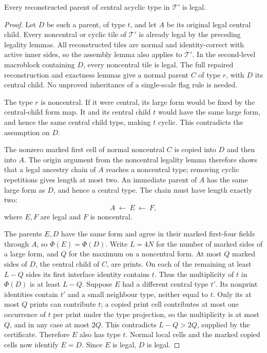 \begin{lemma}
\label{lem:comp/acyclic-legal}
Every reconstructed parent of central acyclic type in $\mathcal T'$ is legal.
\end{lemma}
\begin{proof}
Let $D$ be such a parent, of type $t$, and let $A$ be its original legal
central child. Every noncentral or cyclic tile of $\mathcal T'$ is already
legal by the preceding legality lemmas. All reconstructed tiles are normal
and identity-correct with active inner sides, so the assembly lemma also applies to
$\mathcal T'$. In the second-level macroblock containing $D$, every
noncentral tile is legal. The full repaired reconstruction and exactness
lemmas give a normal parent $C$ of type $r$, with $D$ its central child.
No unproved inheritance of a single-scale flag rule is needed.

The type $r$ is noncentral. If it were central, its large form would be
fixed by the central-child form map. It and its central child $t$ would
have the same large form, and hence the same central child type, making
$t$ cyclic. This contradicts the assumption on $D$.

The nonzero marked first cell of normal noncentral $C$ is copied into
$D$ and then into $A$. The origin argument from the noncentral legality
lemma therefore shows that a legal ancestry chain of $A$ reaches a
noncentral type; removing cyclic repetitions gives length at most two.
An immediate parent of $A$ has the same large form as $D$, and hence a
central type. The chain must have length exactly two:
\[
 A\ \longleftarrow\ E\ \longleftarrow\ F,
\]
where $E,F$ are legal and $F$ is noncentral.

The parents $E,D$ have the same form and agree in their marked first-four
fields through $A$, so $\Phi(E)=\Phi(D)$. Write $L=4N$ for the number
of marked sides of a large form, and $Q$ for the maximum on a noncentral
form. At most $Q$ marked sides of $D$, the central child of $C$, are prints.
On each of the remaining at least $L-Q$ sides its first interface identity
contains $t$. Thus the multiplicity of $t$ in $\Phi(D)$ is at least $L-Q$.
Suppose $E$ had a different central type $t'$. Its nonprint identities
contain $t'$ and a small neighbour type, neither equal to $t$. Only its
at most $Q$ prints can contribute $t$; a copied print cell contributes at
most one occurrence of $t$ per print under the type projection, so the
multiplicity is at most $Q$, and in any case at most $2Q$.
This contradicts $L-Q>2Q$, supplied by the certificate. Therefore $E$
also has type $t$. Normal local cells and the marked copied cells now
identify $E=D$. Since $E$ is legal, $D$ is legal.
\end{proof}

